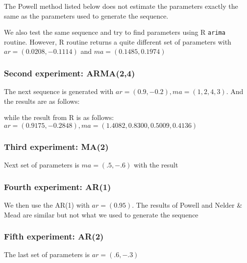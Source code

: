 \documentclass{article}
\begin{document}
 The Powell method listed below does not estimate the parameters exactly the
 same as the parameters used to generate the sequence.


 We also test the same sequence and try to find parameters using R
 \texttt{arima} routine. However, R routine returns a quite different set of
 parameters with  $ar = (0.0208, -0.1114)$ and $ma =
 (0.1485, 0.1974)$
 
 \subsubsection{Second experiment: ARMA(2,4)}
 The next sequence is generated with $ar=(0.9,-0.2), ma=(1,2,4,3)$. And the
 results are as follows:

  
  while the result from R is as follows: $ar=(0.9175, -0.2848 ), ma
  =(1.4082, 0.8300, 0.5009, 0.4136)$
 \subsubsection{Third experiment: MA(2)}
 Next set of parameters is $ma=(.5,-.6)$ with the result
 
 \subsubsection{Fourth experiment: AR(1)}
 We then use the AR(1) with $ar = (0.95)$. The results of Powell and
 Nelder \& Mead are similar but not what we used to generate the sequence
 
 
 \subsubsection{Fifth experiment: AR(2)}
 The last set of parameters is $ar=(.6,-.3)$
\end{document}
